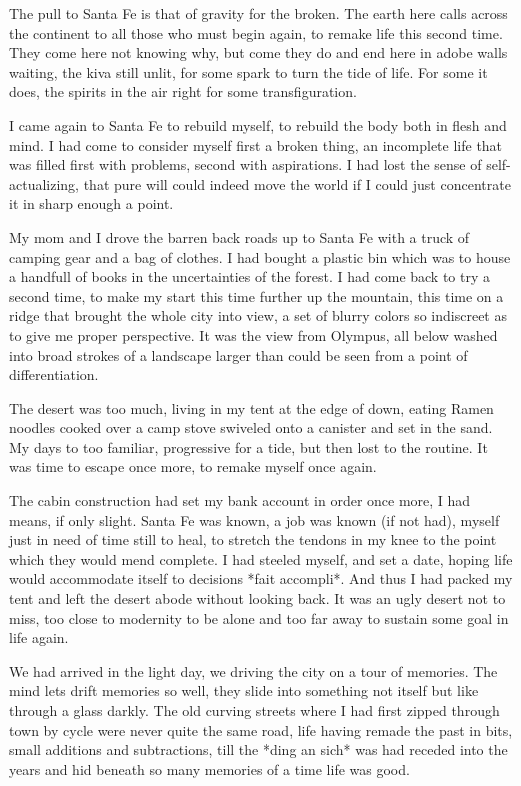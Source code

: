 \documentclass[ebook, 10pt, openright, onecolumn]{memoir}
\begin{document}
The pull to Santa Fe is that of gravity for the broken.  The earth here calls
across the continent to all those who must begin again, to remake life this
second time.  They come here not knowing why, but come they do and end here in
adobe walls waiting, the kiva still unlit, for some spark to turn the tide of
life.  For some it does, the spirits in the air right for some transfiguration.

I came again to Santa Fe to rebuild myself, to rebuild the body both in flesh
and mind.  I had come to consider myself first a broken thing, an incomplete
life that was filled first with problems, second with aspirations.  I had lost
the sense of self-actualizing, that pure will could indeed move the world if I
could just concentrate it in sharp enough a point.

My mom and I drove the barren back roads up to Santa Fe with a truck of camping
gear and a bag of clothes.  I had bought a plastic bin which was to house a
handfull of books in the uncertainties of the forest.  I had come back to try a
second time, to make my start this time further up the mountain, this time on a
ridge that brought the whole city into view, a set of blurry colors so
indiscreet as to give me proper perspective.  It was the view from Olympus, all
below washed into broad strokes of a landscape larger than could be seen from a
point of differentiation.  

The desert was too much, living in my tent at the edge of down, eating Ramen
noodles cooked over a camp stove swiveled onto a canister and set in the sand.
My days to too familiar, progressive for a tide, but then lost to the routine.
It was time to escape once more, to remake myself once again.

The cabin construction had set my bank account in order once more, I had means,
if only slight.  Santa Fe was known, a job was known (if not had), myself just
in need of time still to heal, to stretch the tendons in my knee to the point
which they would mend complete. I had steeled myself, and set a date, hoping
life would accommodate itself to decisions *fait accompli*.  And thus I had
packed my tent and left the desert abode without looking back.  It was an ugly
desert not to miss, too close to modernity to be alone and too far away to
sustain some goal in life again.

We had arrived in the light day, we driving the city on a tour of memories.  The
mind lets drift memories so well, they slide into something not itself but like
through a glass darkly.  The old curving streets where I had first zipped
through town by cycle were never quite the same road, life having remade the
past in bits, small additions and subtractions, till the *ding an sich* was had
receded into the years and hid beneath so many memories of a time life was good.
\end{document}
